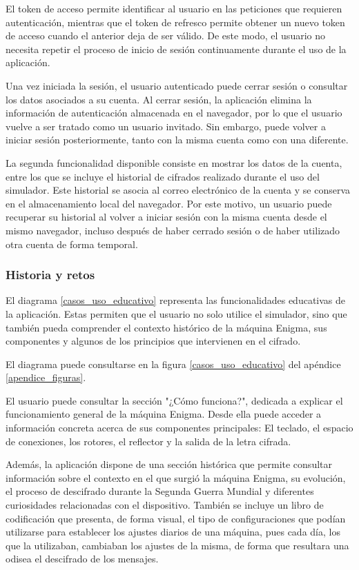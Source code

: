 El token de acceso permite identificar al usuario en las peticiones que requieren autenticación, mientras que el token de refresco permite obtener un nuevo token de acceso cuando el anterior deja de ser válido. De este modo, el usuario no necesita repetir el proceso de inicio de sesión continuamente durante el uso de la aplicación.

Una vez iniciada la sesión, el usuario autenticado puede cerrar sesión o consultar los datos asociados a su cuenta. Al cerrar sesión, la aplicación elimina la información de autenticación almacenada en el navegador, por lo que el usuario vuelve a ser tratado como un usuario invitado. Sin embargo, puede volver a iniciar sesión posteriormente, tanto con la misma cuenta como con una diferente.

La segunda funcionalidad disponible consiste en mostrar los datos de la cuenta, entre los que se incluye el historial de cifrados realizado durante el uso del simulador. Este historial se asocia al correo electrónico de la cuenta y se conserva en el almacenamiento local del navegador. Por este motivo, un usuario puede recuperar su historial al volver a iniciar sesión con la misma cuenta desde el mismo navegador, incluso después de haber cerrado sesión o de haber utilizado otra cuenta de forma temporal.

\subsubsection{Historia y retos}

El diagrama \ref{casos_uso_educativo} representa las funcionalidades educativas de la aplicación. Estas permiten que el usuario no solo utilice el simulador, sino que también pueda comprender el contexto histórico de la máquina Enigma, sus componentes y algunos de los principios que intervienen en el cifrado.

El diagrama puede consultarse en la figura \ref{casos_uso_educativo} del apéndice \ref{apendice_figuras}.

El usuario puede consultar la sección "¿Cómo funciona?", dedicada a explicar el funcionamiento general de la máquina Enigma. Desde ella puede acceder a información concreta acerca de sus componentes principales: El teclado, el espacio de conexiones, los rotores, el reflector y la salida de la letra cifrada.

Además, la aplicación dispone de una sección histórica que permite consultar información sobre el contexto en el que surgió la máquina Enigma, su evolución, el proceso de descifrado durante la Segunda Guerra Mundial y diferentes curiosidades relacionadas con el dispositivo. También se incluye un libro de codificación que presenta, de forma visual, el tipo de configuraciones que podían utilizarse para establecer los ajustes diarios de una máquina, pues cada día, los que la utilizaban, cambiaban los ajustes de la misma, de forma que resultara una odisea el descifrado de los mensajes.

